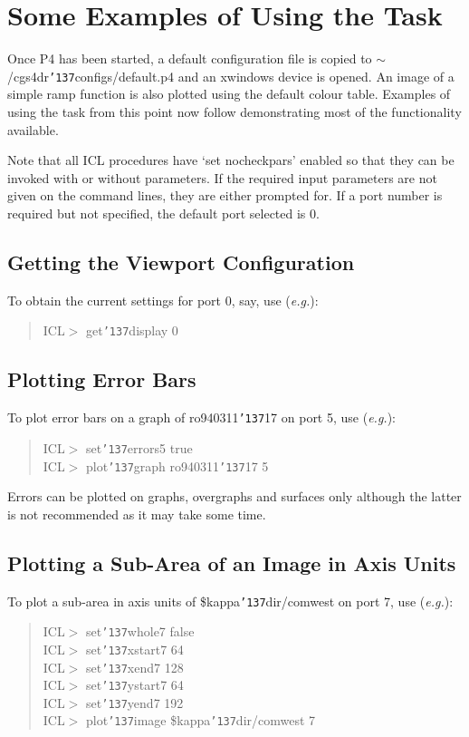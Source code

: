 \documentclass[a4paper]{book}
\renewcommand{\_}{{\tt\char'137}}
\begin{document}
\section{Some Examples of Using the Task}
Once P4 has been started, a default configuration file is copied to
$\sim$/cgs4dr\_configs/default.p4 and an xwindows device is opened. An
image of a simple ramp function is also plotted using the default
colour table. Examples of using the task from this point now follow
demonstrating most of the functionality available.

Note that all ICL procedures have `set nocheckpars' enabled so that
they can be invoked with or without parameters. If the required input
parameters are not given on the command lines, they are either prompted
for. If a port number is required but not specified, the default port
selected is 0.

\subsection{Getting the Viewport Configuration}
To obtain the current settings for port 0, say, use ({\em e.g.}):

\begin{quote}
ICL$>$ get\_display 0
\end{quote}

\subsection{Plotting Error Bars}
To plot error bars on a graph of ro940311\_17 on port 5, use ({\em e.g.}):

\begin{quote}
ICL$>$ set\_errors5 true \\
ICL$>$ plot\_graph ro940311\_17 5
\end{quote}

Errors can be plotted on graphs, overgraphs and surfaces only although
the latter is not recommended as it may take some time.

\subsection{Plotting a Sub-Area of an Image in Axis Units} 
To plot a sub-area in axis units of {\sc \$kappa\_dir}/comwest on port
7, use ({\em e.g.}):

\begin{quote}
ICL$>$ set\_whole7 false \\
ICL$>$ set\_xstart7 64 \\
ICL$>$ set\_xend7 128 \\
ICL$>$ set\_ystart7 64 \\
ICL$>$ set\_yend7 192 \\
ICL$>$ plot\_image {\sc \$kappa\_dir}/comwest 7
\end{quote}
\end{document}
